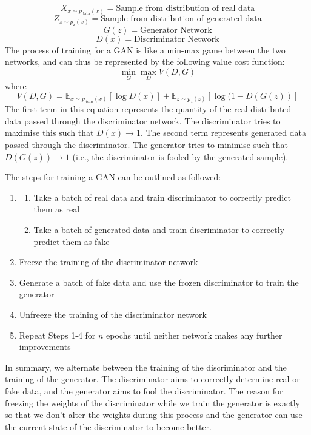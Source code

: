 \documentclass[12pt,a4paper,twoside]{report}
\begin{document}
$$X_{x\sim p_\text{data}(x)} = \text{Sample from distribution of real data} $$
$$Z_{z\sim p_\text{z}(x)} = \text{Sample from distribution of generated data} $$
$$G(z) = \text{Generator Network}$$
$$D(x) = \text{Discriminator Network}$$
The process of training for a GAN is like a min-max game between the two networks, and can thus be represented by the following value cost function:
$$\min _ { G } \max _ { D } V ( D ,G )$$
where 
$$V ( D ,G ) = \mathbb { E } _ { x \sim p _ { d a t a } ( x ) } [ \log D ( x ) ] + \mathbb { E } _ { z \sim p _ { z } ( z ) }[ \log ( 1- D ( G ( z ) ) ] $$
The first term in this equation represents the quantity of the real-distributed data passed through the discriminator network. The discriminator tries to maximise this such that $D(x)\rightarrow 1$. The second term represents generated data passed through the discriminator. The generator tries to minimise such that $D(G(z))\rightarrow 1$ (i.e., the discriminator is fooled by the generated sample).

The steps for training a GAN can be outlined as followed:
\begin{enumerate}[Step 1:]
  \item 
  \begin{enumerate}
  \item Take a batch of real data and train discriminator to correctly predict them as real
  \item Take a batch of generated data and train discriminator to correctly predict them as fake
  \end{enumerate}
  
  \item Freeze the training of the discriminator network
  \item Generate a batch of fake data and use the frozen discriminator to train the generator
  \item Unfreeze the training of the discriminator network
  \item Repeat Steps 1-4 for $n$ epochs until neither network makes any further improvements
\end{enumerate}

In summary, we alternate between the training of the discriminator and the training of the generator. The discriminator aims to correctly determine real or fake data, and the generator aims to fool the discriminator. The reason for freezing the weights of the discriminator while we train the generator is exactly so that we don't alter the weights during this process and the generator can use the current state of the discriminator to become better.
\end{document}
